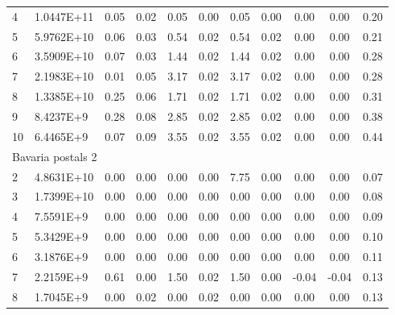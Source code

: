 {\begin{longtable}{@{}llccccccccc@{}}
4  & 1.0447E+11 & 0.05         & 0.02         & 0.05        & 0.00       & 0.05        & 0.00      & 0.00      & 0.00      & 0.20  \\
5  & 5.9762E+10 & 0.06         & 0.03         & 0.54        & 0.02       & 0.54        & 0.02      & 0.00      & 0.00      & 0.21  \\
6  & 3.5909E+10 & 0.07         & 0.03         & 1.44        & 0.02       & 1.44        & 0.02      & 0.00      & 0.00      & 0.28  \\
7  & 2.1983E+10 & 0.01         & 0.05         & 3.17        & 0.02       & 3.17        & 0.02      & 0.00      & 0.00      & 0.28  \\
8  & 1.3385E+10 & 0.25         & 0.06         & 1.71        & 0.02       & 1.71        & 0.02      & 0.00      & 0.00      & 0.31  \\
9  & 8.4237E+9  & 0.28         & 0.08         & 2.85        & 0.02       & 2.85        & 0.02      & 0.00      & 0.00      & 0.38  \\
10 & 6.4465E+9  & 0.07         & 0.09         & 3.55        & 0.02       & 3.55        & 0.02      & 0.00      & 0.00      & 0.44  \\
\multicolumn{11}{l}{Bavaria postals 2}                                                                                             \\
2  & 4.8631E+10 & 0.00         & 0.00         & 0.00        & 0.00       & 7.75        & 0.00      & 0.00      & 0.00      & 0.07  \\
3  & 1.7399E+10 & 0.00         & 0.00         & 0.00        & 0.00       & 0.00        & 0.00      & 0.00      & 0.00      & 0.08  \\
4  & 7.5591E+9  & 0.00         & 0.00         & 0.00        & 0.00       & 0.00        & 0.00      & 0.00      & 0.00      & 0.09  \\
5  & 5.3429E+9  & 0.00         & 0.00         & 0.00        & 0.00       & 0.00        & 0.00      & 0.00      & 0.00      & 0.10  \\
6  & 3.1876E+9  & 0.00         & 0.00         & 0.00        & 0.00       & 0.00        & 0.00      & 0.00      & 0.00      & 0.11  \\
7  & 2.2159E+9  & 0.61         & 0.00         & 1.50        & 0.02       & 1.50        & 0.00      & -0.04     & -0.04     & 0.13  \\
8  & 1.7045E+9  & 0.00         & 0.02         & 0.00        & 0.02       & 0.00        & 0.00      & 0.00      & 0.00      & 0.13  \\

\end{longtable}}
